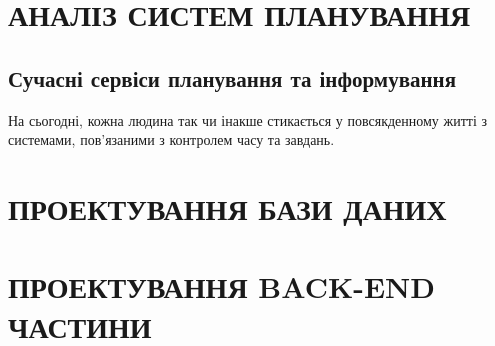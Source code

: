 \documentclass[a4paper,14pt]{extarticle} %
\begin{document}

\tableofcontents %
\clearpage


\section{АНАЛІЗ СИСТЕМ ПЛАНУВАННЯ}

\subsection{Сучасні сервіси планування та інформування}

На сьогодні, кожна людина так чи інакше стикається у повсякденному житті з системами, пов'язаними з контролем часу та завдань.






\section{ПРОЕКТУВАННЯ БАЗИ ДАНИХ}






\section{ПРОЕКТУВАННЯ BACK-END ЧАСТИНИ}





\end{document}
